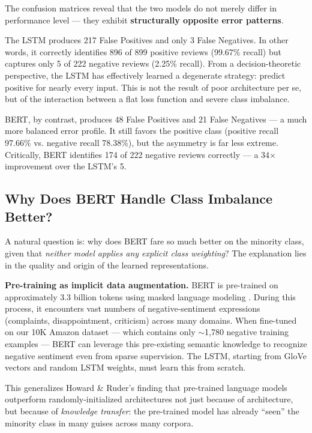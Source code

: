 \documentclass[11pt, a4paper]{article}
\begin{document}
The confusion matrices reveal that the two models do not merely differ in performance level --- they exhibit \textbf{structurally opposite error patterns}.

The LSTM produces 217 False Positives and only 3 False Negatives. In other words, it correctly identifies 896 of 899 positive reviews (99.67\% recall) but captures only 5 of 222 negative reviews (2.25\% recall). From a decision-theoretic perspective, the LSTM has effectively learned a degenerate strategy: predict positive for nearly every input. This is not the result of poor architecture per se, but of the interaction between a flat loss function and severe class imbalance.

BERT, by contrast, produces 48 False Positives and 21 False Negatives --- a much more balanced error profile. It still favors the positive class (positive recall 97.66\% vs. negative recall 78.38\%), but the asymmetry is far less extreme. Critically, BERT identifies 174 of 222 negative reviews correctly --- a 34$\times$ improvement over the LSTM's 5.

\subsection{Why Does BERT Handle Class Imbalance Better?}

A natural question is: why does BERT fare so much better on the minority class, given that \textit{neither model applies any explicit class weighting}? The explanation lies in the quality and origin of the learned representations.

\textbf{Pre-training as implicit data augmentation.} BERT is pre-trained on approximately 3.3 billion tokens using masked language modeling \cite{devlin2019bert}. During this process, it encounters vast numbers of negative-sentiment expressions (complaints, disappointment, criticism) across many domains. When fine-tuned on our 10K Amazon dataset --- which contains only $\sim$1,780 negative training examples --- BERT can leverage this pre-existing semantic knowledge to recognize negative sentiment even from sparse supervision. The LSTM, starting from GloVe vectors and random LSTM weights, must learn this from scratch.

This generalizes Howard \& Ruder's finding \cite{howard2018ulmfit} that pre-trained language models outperform randomly-initialized architectures not just because of architecture, but because of \textit{knowledge transfer}: the pre-trained model has already ``seen'' the minority class in many guises across many corpora.
\end{document}
